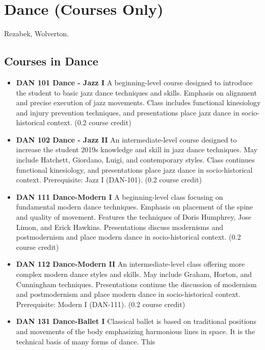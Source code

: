 \documentclass[
  letterpaper,
]{scrbook}
\providecommand{\tightlist}{%
  \setlength{\itemsep}{0pt}\setlength{\parskip}{0pt}}
\begin{document}
\hypertarget{sec-dance}{%
\section{Dance (Courses Only)}\label{sec-dance}}

Rezabek, Wolverton.

\hypertarget{courses-in-dance}{%
\subsection{Courses in Dance}\label{courses-in-dance}}

\begin{itemize}
\tightlist
\item
  \textbf{DAN 101 Dance - Jazz I} A beginning-level course designed to
  introduce the student to basic jazz dance techniques and skills.
  Emphasis on alignment and precise execution of jazz movements. Class
  includes functional kinesiology and injury prevention techniques, and
  presentations place jazz dance in socio-historical context. (0.2
  course credit)
\item
  \textbf{DAN 102 Dance - Jazz II} An intermediate-level course designed
  to increase the student 2019s knowledge and skill in jazz dance
  techniques. May include Hatchett, Giordano, Luigi, and contemporary
  styles. Class continues functional kinesiology, and presentations
  place jazz dance in socio-historical context. Prerequisite: Jazz I
  (DAN-101). (0.2 course credit)
\item
  \textbf{DAN 111 Dance-Modern I} A beginning-level class focusing on
  fundamental modern dance techniques. Emphasis on placement of the
  spine and quality of movement. Features the techniques of Doris
  Humphrey, Jose Limon, and Erick Hawkins. Presentations discuss
  modernisms and postmodernism and place modern dance in
  socio-historical context. (0.2 course credit)
\item
  \textbf{DAN 112 Dance-Modern II} An intermediate-level class offering
  more complex modern dance styles and skills. May include Graham,
  Horton, and Cunningham techniques. Presentations continue the
  discussion of modernism and postmodernism and place modern dance in
  socio-historical context. Prerequisite: Modern I (DAN-111). (0.2
  course credit)
\item
  \textbf{DAN 131 Dance-Ballet I} Classical ballet is based on
  traditional positions and movements of the body emphasizing harmonious
  lines in space. It is the technical basis of many forms of dance. This

\end{itemize}
\end{document}
